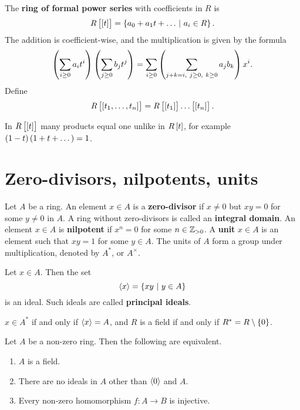 \begin{definition}
The \textbf{ring of formal power series} with coefficients in $ R $ is
$$ R\sbr{\sbr{t}} = \cbr{a_0 + a_1t + \dots \st a_i \in R}. $$
The addition is coefficient-wise, and the multiplication is given by the formula
$$ \br{\sum_{i \ge 0} a_it^i}\br{\sum_{j \ge 0} b_jt^j} = \sum_{i \ge 0} \br{\sum_{j + k = i, \ j \ge 0, \ k \ge 0} a_jb_k}x^i. $$
Define
$$ R\sbr{\sbr{t_1, \dots, t_n}} = R\sbr{\sbr{t_1}} \dots \sbr{\sbr{t_n}}. $$
\end{definition}

In $ R\sbr{\sbr{t}} $ many products equal one unlike in $ R\sbr{t} $, for example $ \br{1 - t}\br{1 + t + \dots} = 1 $.

\section{Zero-divisors, nilpotents, units}

\begin{definition}
Let $ A $ be a ring. An element $ x \in A $ is a \textbf{zero-divisor} if $ x \ne 0 $ but $ xy = 0 $ for some $ y \ne 0 $ in $ A $. A ring without zero-divisors is called an \textbf{integral domain}. An element $ x \in A $ is \textbf{nilpotent} if $ x^n = 0 $ for some $ n \in \mathbb{Z}_{> 0} $. A \textbf{unit} $ x \in A $ is an element such that $ xy = 1 $ for some $ y \in A $. The units of $ A $ form a group under multiplication, denoted by $ A^* $, or $ A^\times $.
\end{definition}

\begin{definition}
Let $ x \in A $. Then the set
$$ \abr{x} = \cbr{xy \st y \in A} $$
is an ideal. Such ideals are called \textbf{principal ideals}.
\end{definition}

\begin{remark*}
$ x \in A^* $ if and only if $ \left\langle x \right\rangle = A $, and $ R $ is a field if and only if $ R^* = R \setminus \cbr{0} $.
\end{remark*}

\begin{proposition}
Let $ A $ be a non-zero ring. Then the following are equivalent.
\begin{enumerate}
\item $ A $ is a field.
\item There are no ideals in $ A $ other than $ \left\langle 0 \right\rangle $ and $ A $.
\item Every non-zero homomorphism $ f : A \to B $ is injective.
\end{enumerate}
\end{proposition}

